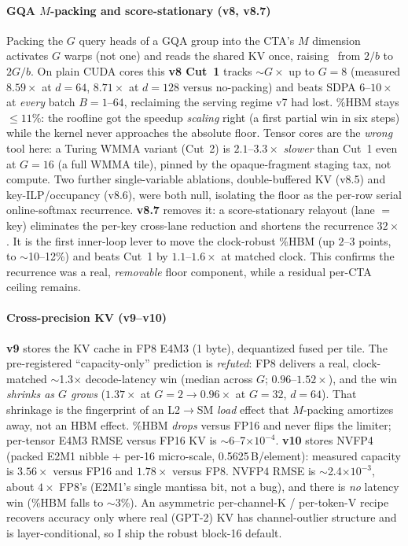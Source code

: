 \paragraph{GQA $M$-packing and score-stationary (v8, v8.7)}
Packing the $G$ query heads of a GQA group into the CTA's $M$ dimension activates
$G$ warps (not one) and reads the shared KV once, raising \ai\ from $2/b$ to
$2G/b$. On plain CUDA cores this \textbf{v8 Cut~1} tracks $\sim G\times$ up to
$G{=}8$ (measured $8.59\times$ at $d{=}64$, $8.71\times$ at $d{=}128$ versus
no-packing) and beats SDPA $6$--$10\times$ at \emph{every} batch $B{=}1$--$64$,
reclaiming the serving regime v7 had lost. \%HBM stays $\le 11\%$: the roofline
got the speedup \emph{scaling} right (a first partial win in six steps) while the
kernel never approaches the absolute floor. Tensor cores are the \emph{wrong}
tool here: a Turing WMMA variant (Cut~2) is $2.1$--$3.3\times$ \emph{slower} than
Cut~1 even at $G{=}16$ (a full WMMA tile), pinned by the opaque-fragment
staging tax, not compute. Two further single-variable ablations, double-buffered
KV (v8.5) and key-ILP/occupancy (v8.6), were both null, isolating the floor as
the per-row serial online-softmax recurrence. \textbf{v8.7} removes it: a
score-stationary relayout (lane $=$ key) eliminates the per-key cross-lane
reduction and shortens the recurrence $32\times$. It is the first inner-loop
lever to move the clock-robust \%HBM (up $2$--$3$ points, to $\sim$10--12\%) and
beats Cut~1 by $1.1$--$1.6\times$ at matched clock. This confirms the recurrence
was a real, \emph{removable} floor component, while a residual per-CTA ceiling
remains.

\paragraph{Cross-precision KV (v9--v10)}
\textbf{v9} stores the KV cache in FP8 E4M3 (1 byte), dequantized fused per tile.
The pre-registered ``capacity-only'' prediction is \emph{refuted}: FP8 delivers a
real, clock-matched $\sim$1.3$\times$ decode-latency win (median across $G$;
$0.96$--$1.52\times$), and the win \emph{shrinks as $G$ grows}
($1.37\times$ at $G{=}2 \to 0.96\times$ at $G{=}32$, $d{=}64$). That shrinkage is
the fingerprint of an L2$\to$SM \emph{load} effect that $M$-packing amortizes
away, not an HBM effect. \%HBM \emph{drops} versus FP16 and never flips the limiter; per-tensor
E4M3 RMSE versus FP16 KV is $\sim$6--7$\times10^{-4}$. \textbf{v10} stores NVFP4
(packed E2M1 nibble $+$ per-16 micro-scale, 0.5625\,B/element): measured capacity
is $3.56\times$ versus FP16 and $1.78\times$ versus FP8. NVFP4 RMSE is
$\sim$2.4$\times10^{-3}$, about $4\times$ FP8's (E2M1's single mantissa bit, not
a bug), and there is \emph{no} latency win (\%HBM falls to $\sim$3\%). An
asymmetric per-channel-K / per-token-V recipe recovers accuracy only where real
(GPT-2) KV has channel-outlier structure and is layer-conditional, so I ship the
robust block-16 default.


